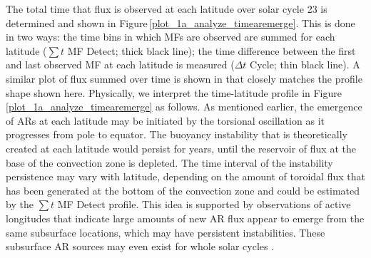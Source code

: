 \documentclass[namedreferences]{solarphysics}
\begin{document}
\begin{article}
The total time that flux is observed at each latitude over solar cycle 23 is determined and shown in  Figure\,\ref{plot_1a_analyze_timearemerge}. This is done in two ways: the time bins in which MFs are observed are summed for each latitude ($\sum t$ MF Detect; thick black line); the time difference between the first and last observed MF at each latitude is measured ($\Delta t$ Cycle; thin black line). A similar plot of flux summed over time is shown in \citet{jin:2012} that closely matches the profile shape shown here. %
 Physically, we interpret the time-latitude profile in Figure\,\ref{plot_1a_analyze_timearemerge} as follows.
As mentioned earlier, the emergence of ARs at each latitude may be initiated by the torsional oscillation as it progresses from pole to equator. The buoyancy instability that is theoretically created at each latitude would persist for years, until the reservoir of flux at the base of the convection zone is depleted. The time interval of the instability persistence may vary with latitude, depending on the amount of toroidal flux that has been generated at the bottom of the convection zone and could be estimated by the $\sum t$ MF Detect profile. This idea is supported by observations of active longitudes \citep{Gaizauskas:1983, chen:2011} that indicate large amounts of new AR flux appear to emerge from the same subsurface locations, which may have persistent instabilities. These subsurface AR sources may even exist for whole solar cycles \citep{Henney:2002, Berdyugina:2003}.


\end{article}
\end{document}

